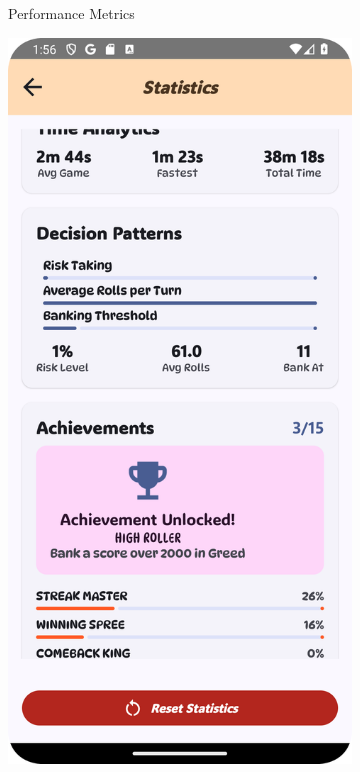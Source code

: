 \begin{figure}[ht!]
\begin{subfigure}[b]{0.27\textwidth}
        \caption{Performance Metrics}
    \end{subfigure}
    \hfill
    \begin{subfigure}[b]{0.27\textwidth}
        \includegraphics[width=\textwidth]{img/statistics screen3.png}

\end{subfigure}
\end{figure}
